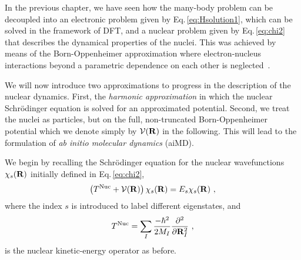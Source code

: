 In the previous chapter, we have seen how the many-body problem can be decoupled into an electronic problem given by Eq.\,\eqref{eq:Hsolution1}, which can be solved in the framework of DFT, and a nuclear problem given by Eq.\,\eqref{eq:chi2} that describes the dynamical properties of the nuclei. This was achieved by means of the Born-Oppenheimer approximation where electron-nucleus interactions beyond a parametric dependence on each other is neglected~\cite{BornOppenheimer}.

We will now introduce two approximations to progress in the description of the nuclear dynamics. First, the \emph{harmonic approximation} in which the nuclear Schr\"odinger equation is solved for an approximated potential. Second, we treat the nuclei as particles, but on the full, non-truncated Born-Oppenheimer potential which we denote simply by $\mathcal V ({\bf R})$ in the following. This will lead to the formulation of \emph{ab initio molecular dynamics} (aiMD).

We begin by recalling the Schr\"odinger equation for the nuclear wavefunctions $\chi_s ({\bf R})$ initially defined in Eq.\,\eqref{eq:chi2},
\begin{align}
  \left( T^{\rm Nuc} + \mathcal V ({\bf R}) \right) \chi_s ({\bf R})
  = E_s \chi_s ({\bf R})~,
  \label{eq:BOSE}
\end{align}
where the index $s$ is introduced to label different eigenstates, and
\begin{align}
  T^{\rm Nuc}
    = \sum_I \frac{- \hbar^2}{2 M_I} \frac{\partial^2}{\partial {\bf R}_I^2}~,
  \label{eq:Tnuc2}
\end{align}
is the nuclear kinetic-energy operator as before.

